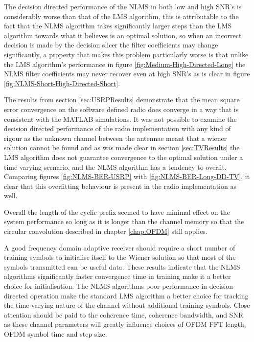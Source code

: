 The decision directed performance of the NLMS in both low and high %
SNR's is considerably worse than that of the LMS algorithm, this is %
attributable to the fact that the NLMS algorithm takes significantly %
larger steps than the LMS algorithm towards what it believes is %
an optimal solution, so when an incorrect decision is made by the %
decision slicer the filter coefficients may change significantly, %
a property that makes this problem particularly worse is that unlike %
the LMS algorithm's performance in figure \ref{fig:Medium-High-Directed-Long} 
the NLMS filter coefficients may never recover even at high SNR's as %
is clear in figure \ref{fig:NLMS-Short-High-Directed-Short}.

The results from section \ref{sec:USRPResults} demonstrate that %
the mean square error convergence on the software defined %
radio does converge in a way that is consistent with the MATLAB %
simulations. It was not possible to examine the decision directed %
performance of the radio implementation with any kind of rigour %
as the unknown channel between the antennae meant that %
a wiener solution cannot be found and as was made clear in section %
\ref{sec:TVResults} the LMS algorithm does not guarantee %
convergence to the optimal solution under a time varying scenario, and %
the NLMS algorithm has a tendency to overfit. Comparing figures %
\ref{fig:NLMS-BER-USRP} with \ref{fig:NLMS-BER-Long-DD-TV}, it %
clear that this overfitting behaviour is present in the radio implementation %
as well.

Overall the length of the cyclic prefix seemed to have minimal effect %
on the system performance so long as it is longer than the %
channel memory so that the circular convolution described in %
chapter \ref{chap:OFDM} still applies.

A good frequency domain adaptive receiver should require a short %
number of training symbols to initialise itself to the Wiener solution %
so that most of the symbols transmitted can be useful data. These %
results indicate that the NLMS algorithms significantly faster convergence %
time in training make it a better choice for initialisation. The NLMS algorithms %
poor performance in decision directed operation make the standard LMS %
algorithm a better choice for tracking the time-varying nature of the channel %
without additional training symbols. Close attention should be paid to the %
coherence time, coherence bandwidth, and SNR as these channel parameters %
will greatly influence choices of OFDM FFT length, OFDM symbol time and %
step size.


